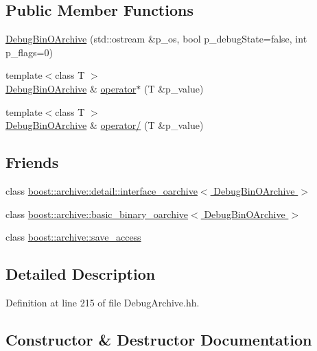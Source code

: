 \subsection*{Public Member Functions}
\begin{DoxyCompactItemize}
\item 
\hyperlink{classxtd_1_1serializer_1_1DebugBinOArchive_a24ef5240df842821499a32be217018ac}{Debug\+Bin\+O\+Archive} (std\+::ostream \&p\+\_\+os, bool p\+\_\+debug\+State=false, int p\+\_\+flags=0)
\item 
{\footnotesize template$<$class T $>$ }\\\hyperlink{classxtd_1_1serializer_1_1DebugBinOArchive}{Debug\+Bin\+O\+Archive} \& \hyperlink{classxtd_1_1serializer_1_1DebugBinOArchive_a47872bf2656b80e613d1b6d946437be2}{operator$\ast$} (T \&p\+\_\+value)
\item 
{\footnotesize template$<$class T $>$ }\\\hyperlink{classxtd_1_1serializer_1_1DebugBinOArchive}{Debug\+Bin\+O\+Archive} \& \hyperlink{classxtd_1_1serializer_1_1DebugBinOArchive_a6312cd274de08133d15bcda75d61762e}{operator/} (T \&p\+\_\+value)
\end{DoxyCompactItemize}
\subsection*{Friends}
\begin{DoxyCompactItemize}
\item 
class \hyperlink{classxtd_1_1serializer_1_1DebugBinOArchive_a8319d9e2864d97444125a3c4701611a2}{boost\+::archive\+::detail\+::interface\+\_\+oarchive$<$ Debug\+Bin\+O\+Archive $>$}
\item 
class \hyperlink{classxtd_1_1serializer_1_1DebugBinOArchive_a7b9f0abe54deccaffaf59bd14a6f9f53}{boost\+::archive\+::basic\+\_\+binary\+\_\+oarchive$<$ Debug\+Bin\+O\+Archive $>$}
\item 
class \hyperlink{classxtd_1_1serializer_1_1DebugBinOArchive_aaca003bb8a4fc59424e4025130da4edd}{boost\+::archive\+::save\+\_\+access}
\end{DoxyCompactItemize}


\subsection{Detailed Description}


Definition at line 215 of file Debug\+Archive.\+hh.



\subsection{Constructor \& Destructor Documentation}
